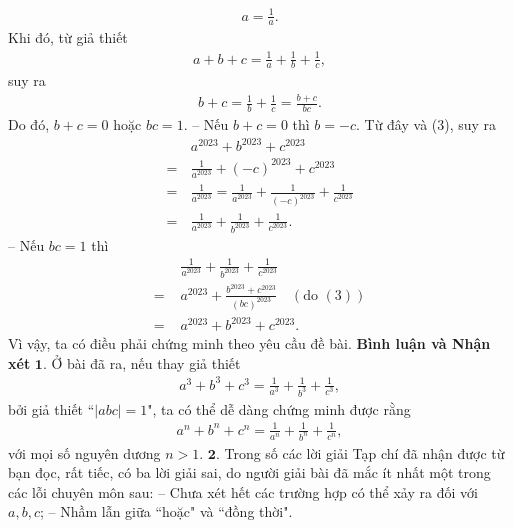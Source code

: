 \begin{multicols}{2}
\begin{align*}
		a = \frac{1}{a}. \tag{$3$}
	\end{align*}
	Khi đó, từ giả thiết
	\begin{align*}
		a + b + c = \frac{1}{a} + \frac{1}{b} + \frac{1}{c},
	\end{align*}
	suy ra
	\begin{align*}
		b + c = \frac{1}{b} + \frac{1}{c} = \frac{{b + c}}{{bc}}.
	\end{align*}
	Do đó, $b + c = 0$ hoặc $bc = 1$.
	\vskip 0.05cm
	-- Nếu $b + c = 0$ thì $b = - c$. Từ đây và ($3$), suy ra
	\begin{align*}
		&{a^{2023}} + {b^{2023}} + {c^{2023}}\\
		 = \,&\frac{1}{{{a^{2023}}}} + {\left( { - c} \right)^{2023}} + {c^{2023}}\\
		  = \,&\frac{1}{{{a^{2023}}}} = \frac{1}{{{a^{2023}}}} + \frac{1}{{{{\left( { - c} \right)}^{2023}}}} + \frac{1}{{{c^{2023}}}}\\
		   = \,&\frac{1}{{{a^{2023}}}} + \frac{1}{{{b^{2023}}}} + \frac{1}{{{c^{2023}}}}.
	\end{align*}
	-- Nếu $bc = 1$ thì
	\begin{align*}
			&\frac{1}{{{a^{2023}}}} + \frac{1}{{{b^{2023}}}} + \frac{1}{{{c^{2023}}}} \\
			= \,\,&{a^{2023}} + \frac{{{b^{2023}} + {c^{2023}}}}{{{{\left( {bc} \right)}^{2023}}}} \quad({\text {do }} (3))\\
			 = \,\,&{a^{2023}} + {b^{2023}} + {c^{2023}}.
	\end{align*}
	Vì vậy, ta có điều phải chứng minh theo yêu cầu đề bài.
	\vskip 0.05cm
	\textbf{\color{thachthuctoanhoc}Bình luận và Nhận xét}
	\vskip 0.05cm
	$\pmb{1.}$ Ở bài đã ra, nếu thay giả thiết
	\begin{align*}
		{a^3} + {b^3} + {c^3} = \frac{1}{{{a^3}}} + \frac{1}{{{b^3}}} + \frac{1}{{{c^3}}},
	\end{align*}
	bởi giả thiết ``$|abc| = 1$", ta có thể dễ dàng chứng minh được rằng
	\begin{align*}
		{a^n} + {b^n} + {c^n} = \frac{1}{{{a^n}}} + \frac{1}{{{b^n}}} + \frac{1}{{{c^n}}},
	\end{align*}
	với mọi số nguyên dương $n > 1$.
	\vskip 0.05cm
	$\pmb{2.}$ Trong số các lời giải Tạp chí đã nhận được từ bạn đọc, rất tiếc, có ba lời giải sai, do người giải bài đã mắc ít nhất một trong các lỗi chuyên môn sau:
	\vskip 0.05cm
	-- Chưa xét hết các trường hợp có thể xảy ra đối với $a, b, c$;
	\vskip 0.05cm
	-- Nhầm lẫn giữa ``hoặc" và ``đồng thời".
	\begin{flushright}

\end{flushright}
\end{multicols}
